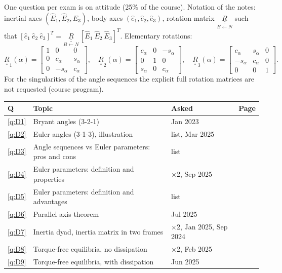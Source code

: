 
One question per exam is on attitude (25\% of the course). Notation of the notes: inertial axes $(\hat E_1,\hat E_2,\hat E_3)$,
body axes $(\hat e_1,\hat e_2,\hat e_3)$, rotation matrix $\underset{B\leftarrow N}{\underline{\underline R}}$ such that
$[\hat e_1\ \hat e_2\ \hat e_3]^T=\underset{B\leftarrow N}{\underline{\underline R}}\,[\hat E_1\ \hat E_2\ \hat E_3]^T$. Elementary rotations:
\begin{equation*}
\underline{\underline R}_1(\alpha)=\begin{bmatrix}1&0&0\\0&c_\alpha&s_\alpha\\0&-s_\alpha&c_\alpha\end{bmatrix},\quad
\underline{\underline R}_2(\alpha)=\begin{bmatrix}c_\alpha&0&-s_\alpha\\0&1&0\\s_\alpha&0&c_\alpha\end{bmatrix},\quad
\underline{\underline R}_3(\alpha)=\begin{bmatrix}c_\alpha&s_\alpha&0\\-s_\alpha&c_\alpha&0\\0&0&1\end{bmatrix}.
\end{equation*}
For the singularities of the angle sequences the explicit full rotation matrices are not requested (course program).

\begin{center}
\small
\begin{tabular}{@{}lllr@{}}
\toprule
Q & Topic & Asked & Page\\
\midrule
\ref{q:D1} & Bryant angles (3-2-1) & Jan 2023 & \pageref{q:D1}\\
\ref{q:D2} & Euler angles (3-1-3), illustration & list, Mar 2025 & \pageref{q:D2}\\
\ref{q:D3} & Angle sequences vs Euler parameters: pros and cons & list & \pageref{q:D3}\\
\ref{q:D4} & Euler parameters: definition and properties & $\times$2, Sep 2025 & \pageref{q:D4}\\
\ref{q:D5} & Euler parameters: definition and advantages & list & \pageref{q:D5}\\
\ref{q:D6} & Parallel axis theorem & Jul 2025 & \pageref{q:D6}\\
\ref{q:D7} & Inertia dyad, inertia matrix in two frames & $\times$2, Jan 2025, Sep 2024 & \pageref{q:D7}\\
\ref{q:D8} & Torque-free equilibria, no dissipation & $\times$2, Feb 2025 & \pageref{q:D8}\\
\ref{q:D9} & Torque-free equilibria, with dissipation & Jun 2025 & \pageref{q:D9}\\
\bottomrule
\end{tabular}
\end{center}

